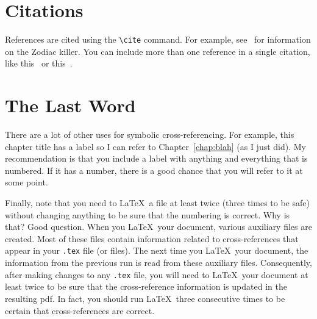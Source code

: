 \section{Citations}

References are cited using the \verb+\cite+ command. For example,
see~\cite{harden} for information on the Zodiac killer. You can include more than one
reference in a single citation, like this~\cite{harden,bib1,basa,bib3,bib2,glurk,bib7,bib10,bib11}
or this~\cite{bibAC,bib17}.


\section{The Last Word}

There are a lot of other uses for symbolic cross-referencing. For example, this chapter
title has a label so I can refer to Chapter~\ref{chap:blah} (as I just did).
My recommendation is that you include a label with anything and everything that
is numbered. If it has a number, there is a good chance that you will
refer to it at some point.

Finally, note that you need to \LaTeX\ a file at least twice (three times to
be safe) without changing anything to be sure that the numbering is correct.
Why is that? Good question.
When you \LaTeX\ your document, various auxiliary files are created. Most of these files contain
information related to cross-references that appear in your {\tt .tex} file (or files). The next time you
\LaTeX\ your document, the information from the previous run is read from
these auxiliary files. Consequently, after making changes to any {\tt .tex}
file, you will need to \LaTeX\ your document at least twice to be sure that the
cross-reference information is updated in the resulting pdf. In fact, you should
run \LaTeX\ three consecutive times to be certain that cross-references are correct.
